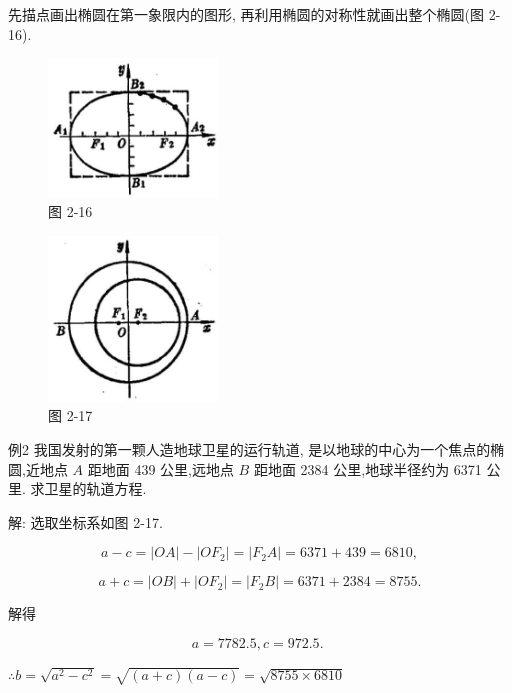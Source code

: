 \documentclass[lang=cn,newtx,10pt,scheme=chinese]{elegantbook}
\begin{document}
先描点画出椭圆在第一象限内的图形, 再利用椭圆的对称性就画出整个椭圆(图 2-16).

\begin{figure}[h]
  \centering
  \includegraphics[max width=0.4\textwidth]{images/01912cc2-ffb6-728e-9ae7-b113ff05c64b_92_523518.jpg}
  \caption{图 2-16}
\end{figure}



\begin{figure}[h]
  \centering
  \includegraphics[max width=0.4\textwidth]{images/01912cc2-ffb6-728e-9ae7-b113ff05c64b_92_511935.jpg}
  \caption{图 2-17}
\end{figure}



例2 我国发射的第一颗人造地球卫星的运行轨道, 是以地球的中心为一个焦点的椭圆,近地点 \(A\) 距地面 439 公里,远地点 \(B\) 距地面 2384 公里,地球半径约为 6371 公里. 求卫星的轨道方程.

解: 选取坐标系如图 2-17.

\[
  a - c = \left| {OA}\right| - \left| {O{F}_{2}}\right| = \left| {{F}_{2}A}\right| = {6371} + {439} = {6810},
\]

\[
  a + c = \left| {OB}\right| + \left| {O{F}_{2}}\right| = \left| {{F}_{2}B}\right| = {6371} + {2384} = {8755}.
\]

解得

\[
  a = {7782.5},c = {972.5}\text{. }
\]

\(\therefore b = \sqrt{{a}^{2} - {c}^{2}} = \sqrt{\left( {a + c}\right) \left( {a - c}\right) } = \sqrt{{8755} \times {6810}}\)
\end{document}

